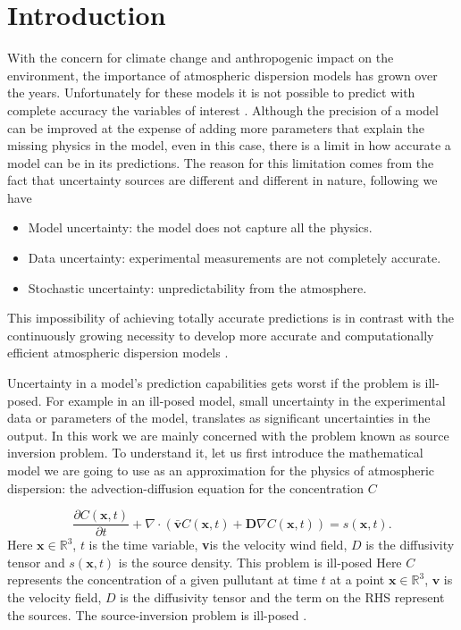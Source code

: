 \documentclass[12pt]{book}
\newcommand{\x}{\textbf{x}}
\newcommand{\vv}{\textbf{v}}
\newcommand{\dv}{\nabla\cdot}
\begin{document}
\chapter{Introduction}

With the concern for climate change and anthropogenic impact on the environment, 
the importance of atmospheric dispersion models has grown over the years. Unfortunately
for these models it is not possible to predict with complete
accuracy the variables of interest \cite{chatwin1982use,lewellen1989meteorological}. 
Although the precision of a model can be improved at the expense
of adding more parameters that explain the missing physics in the model, even
in this case, there is a limit in how accurate a model can be in its predictions.
The reason for this limitation comes from the fact that uncertainty sources
are different and different in nature, following  \cite{rao2005uncertainty}
we have 


\begin{itemize}
\item Model uncertainty: the model does not capture all the physics.
\item Data uncertainty: experimental measurements are not completely accurate.
\item Stochastic uncertainty: unpredictability from the atmosphere.
\end{itemize}

This impossibility of achieving totally accurate predictions
is in contrast with the continuously growing necessity to develop
more accurate and computationally efficient atmospheric dispersion models \cite{leelHossy2014dispersion}. 

Uncertainty in a model's prediction capabilities gets worst if the problem
is ill-posed. For example in an ill-posed model, small uncertainty
in the experimental data or parameters of the model, translates
as significant uncertainties in the output. In this work we 
are mainly concerned with the problem known as source inversion problem.
To understand it, let us first introduce the mathematical model
we are going to use as an approximation for the physics of
atmospheric dispersion: the advection-diffusion equation
for the concentration $C$

\begin{equation*}
\frac{\partial C(\x,t)}{\partial t}+\dv(\bar{\vv}C(\x,t)+\textbf{D}\nabla C(\x,t))=s(\x,t).
\end{equation*}
Here $\x\in\mathbb{R}^{3}$, $t$ is the time variable, \vv is the velocity wind field, $D$
is the diffusivity tensor and $s(\x,t)$ is the source density.
 This problem is ill-posed\cite{enting1990inverse}
Here $C$ represents the concentration of a given pullutant at time $t$ at a point $\x\in\mathbb{R}^{3}$, $\vv$
is the velocity field, $D$ is the diffusivity tensor and the term on the RHS represent the sources. The
source-inversion problem is ill-posed .
\end{document}
